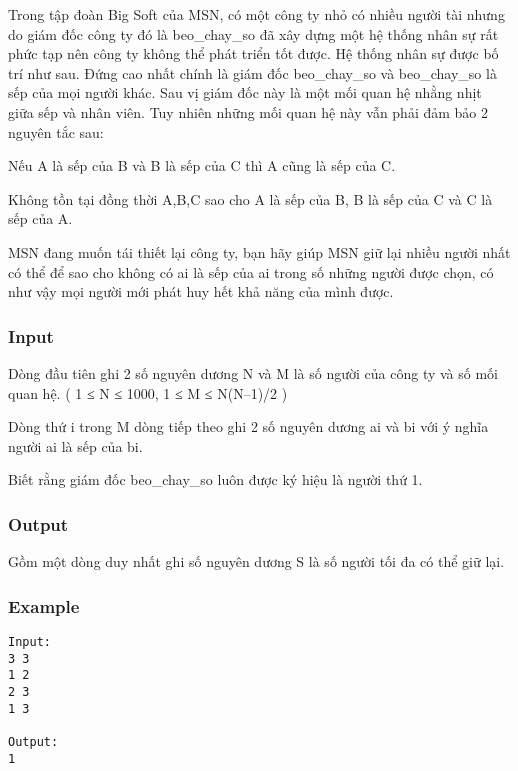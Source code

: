 



   Trong tập đoàn Big Soft của MSN, có một công ty nhỏ có nhiều người tài nhưng do giám đốc công ty đó là beo\_chay\_so đã xây dựng một hệ thống nhân sự rất phức tạp nên công ty không thể phát triển tốt được. Hệ thống nhân sự được bố trí như sau. Đứng cao nhất chính là giám đốc beo\_chay\_so và beo\_chay\_so là sếp của mọi người khác. Sau vị giám đốc này là một mối quan hệ nhằng nhịt giữa sếp và nhân viên. Tuy nhiên những mối quan hệ này vẫn phải đảm bảo 2 nguyên tắc sau:  

   Nếu A là sếp của B và B là sếp của C thì A cũng là sếp của C.  

   Không tồn tại đồng thời A,B,C sao cho A là sếp của B, B là sếp của C và C là sếp của A.  

   MSN đang muốn tái thiết lại công ty, bạn hãy giúp MSN giữ lại nhiều người nhất có thể để sao cho không có ai là sếp của ai trong số những người được chọn, có như vậy mọi người mới phát huy hết khả năng của mình được.  

\subsubsection{   Input  }

   Dòng đầu tiên ghi 2 số nguyên dương N và M là số người của công ty và số mối quan hệ. ( 1 ≤ N ≤ 1000, 1 ≤ M ≤ N(N–1)/2 )  

   Dòng thứ i trong M dòng tiếp theo ghi 2 số nguyên dương ai và bi với ý nghĩa người ai là sếp của bi.  

   Biết rằng giám đốc beo\_chay\_so luôn được ký hiệu là người thứ 1.  

\subsubsection{   Output  }

   Gồm một dòng duy nhất ghi số nguyên dương S là số người tối đa có thể giữ lại.  

\subsubsection{   Example  }
\begin{verbatim}
Input:
3 3
1 2
2 3
1 3

Output:
1
\end{verbatim}